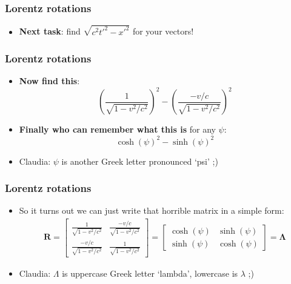 \documentclass{beamer}
\begin{document}
\begin{frame}
  \frametitle{Lorentz rotations}
  \begin{itemize}
    \item<1-> \textbf{Next task}: find $\sqrt{c^2t'^2-x'^2}$ for your vectors!
  \end{itemize}
\end{frame}

\begin{frame}
  \frametitle{Lorentz rotations}
  \begin{itemize}
    \item<1-> \textbf{Now find this}:
      \begin{equation*}
	\left( \frac{1}{\sqrt{1-v^2/c^2}} \right)^2-\left( \frac{-v/c}{\sqrt{1-v^2/c^2}} \right)^2
      \end{equation*}
    \item<2-> \textbf{Finally who can remember what this is} for any $\psi$:
      \begin{equation*}
	\cosh(\psi)^2-\sinh(\psi)^2
      \end{equation*}
    \item<3-> Claudia: $\psi$ is another Greek letter pronounced `psi' ;) 
  \end{itemize}
\end{frame}

\begin{frame}
  \frametitle{Lorentz rotations}
  \begin{itemize}
    \item<1-> So it turns out we can just write that horrible matrix in a simple form:
      \begin{align*}
	\mathbf{R}=
	\begin{bmatrix}
	  \frac{1}{\sqrt{1-v^2/c^2}} & \frac{-v/c}{\sqrt{1-v^2/c^2}}\\
	  \frac{-v/c}{\sqrt{1-v^2/c^2}} & \frac{1}{\sqrt{1-v^2/c^2}}
	\end{bmatrix}
	=
	\begin{bmatrix}
	  \cosh(\psi) & \sinh(\psi)\\
	  \sinh(\psi) & \cosh(\psi)
	\end{bmatrix}
	=\mathbf{\Lambda}
      \end{align*}
    \item<2-> Claudia: $\Lambda$ is uppercase Greek letter `lambda', lowercase is $\lambda$ ;) 
  \end{itemize}
\end{frame}
\end{document}

